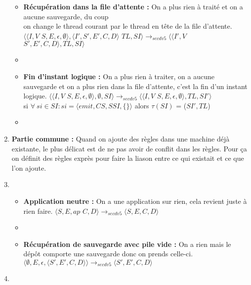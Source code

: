 \documentclass[10pt,a4paper]{article}
\begin{document}
\begin{enumerate}
\begin{itemize}
						\item[] \textbf{Récupération dans la file d'attente :} On a plus rien à traité et on a aucune sauvegarde, du coup 
						\\on change le thread courant par le thread en tête de la file d'attente.
						\smallbreak
						$\langle\langle I,V$ $S,E,\epsilon,\emptyset\rangle,\langle I',S',E',C,D\rangle$ $TL,SI\rangle 
						\longrightarrow_{secdv5} 
						\langle\langle I',V$ $S',E',C,D\rangle,TL,SI\rangle$
						\item[]
						
						\item[] \textbf{Fin d'instant logique :} On a plus rien à traiter, on a aucune sauvegarde et on a plus rien dans la file d'attente, c'est la fin d'un instant logique.
						\smallbreak
						$\langle\langle I,V$ $S,E,\epsilon,\emptyset \rangle ,\emptyset,SI\rangle 
						\longrightarrow_{secdv5} 
						\langle\langle I,V$ $S,E,\epsilon,\emptyset\rangle,TL,SI'\rangle$
						\\si $\forall~si \in SI : si = \langle emit,CS,SSI,\{\}\rangle$ alors $\tau(SI)$ = ($SI',TL$) 
						\item[]
						
					\end{itemize}
					\item[] \textbf{Partie commune :} Quand on ajoute des règles dans une machine déjà existante, le plus délicat est de ne pas avoir de conflit dans les règles. Pour ça on définit des règles exprès pour faire la liason entre ce qui existait et ce que l'on ajoute. 
					\item[]
					\begin{itemize}
						\item[] \textbf{Application neutre :} On a une application sur rien, cela revient juste à rien faire.
						\smallbreak 
						$\langle S,E,ap$ $C,D\rangle
						\longrightarrow_{secdv5} 
						\langle S,E,C,D\rangle$
						\item[]
						\item[] \textbf{Récupération de sauvegarde avec pile vide :}  On a rien mais le dépôt comporte une sauvegarde donc on prends celle-ci.
						\smallbreak  
						$\langle \emptyset,E,\epsilon,\langle S',E',C,D\rangle\rangle
						\longrightarrow_{secdv5} 
						\langle S',E',C,D\rangle$
					\end{itemize}
					
					\item[]
				\end{enumerate}
				\bigbreak
				\bigbreak
				
\end{document}
